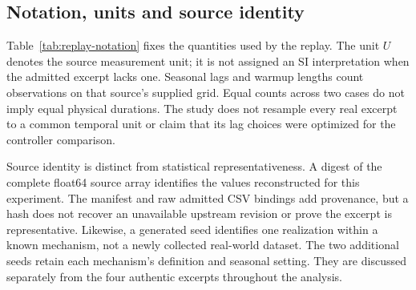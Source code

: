 \subsection{Notation, units and source identity}
Table~\ref{tab:replay-notation} fixes the quantities used by the replay. The unit $U$ denotes the source measurement unit; it is not assigned an SI interpretation when the admitted excerpt lacks one. Seasonal lags and warmup lengths count observations on that source's supplied grid. Equal counts across two cases do not imply equal physical durations. The study does not resample every real excerpt to a common temporal unit or claim that its lag choices were optimized for the controller comparison.

Source identity is distinct from statistical representativeness. A digest of the complete float64 source array identifies the values reconstructed for this experiment. The manifest and raw admitted CSV bindings add provenance, but a hash does not recover an unavailable upstream revision or prove the excerpt is representative. Likewise, a generated seed identifies one realization within a known mechanism, not a newly collected real-world dataset. The two additional seeds retain each mechanism's definition and seasonal setting. They are discussed separately from the four authentic excerpts throughout the analysis.

